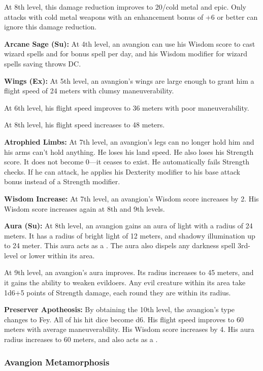 {At 8th level, this damage reduction improves to 20/cold metal and epic. Only attacks with cold metal weapons with an enhancement bonus of +6 or better can ignore this damage reduction.

\textbf{Arcane Sage (Su):} At 4th level, an avangion can use his Wisdom score to cast wizard spells and for bonus spell per day, and his Wisdom modifier for wizard spells saving throws DC.

\textbf{Wings (Ex):} At 5th level, an avangion's wings are large enough to grant him a flight speed of 24 meters with clumsy maneuverability.

At 6th level, his flight speed improves to 36 meters with poor maneuverability.

At 8th level, his flight speed increases to 48 meters.

\textbf{Atrophied Limbs:} At 7th level, an avangion's legs can no longer hold him and his arms can't hold anything. He loses his land speed. He also loses his Strength score. It does not become 0---it ceases to exist. He automatically fails Strength checks. If he can attack, he applies his Dexterity modifier to his base attack bonus instead of a Strength modifier.

\textbf{Wisdom Increase:} At 7th level, an avangion's Wisdom score increases by 2. His Wisdom score increases again at 8th and 9th levels.

\textbf{Aura (Su):} At 8th level, an avangion gains an aura of light with a radius of 24 meters. It has a radius of bright light of 12 meters, and shadowy illumination up to 24 meter. This aura acts as a . The aura also dispels any darkness spell 3rd-level or lower within its area.

At 9th level, an avangion's aura improves. Its radius increases to 45 meters, and it gains the ability to weaken evildoers. Any evil creature within its area take 1d6+5 points of Strength damage, each round they are within its radius.

\textbf{Preserver Apotheosis:} By obtaining the 10th level, the avangion's type changes to Fey. All of his hit dice become d6. His flight speed improves to 60 meters with average maneuverability. His Wisdom score increases by 4. His aura radius increases to 60 meters, and also acts as a .

\subsubsection{Avangion Metamorphosis}
\label{Avangion Metamorphosis}

}
